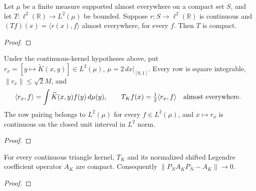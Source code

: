 \begin{supporting}
\begin{theorem}
\label{thm:continuous-l2-rows-compact}
\leanok
Let $\mu$ be a finite measure supported almost everywhere on a compact set $S$,
and let $T:\ell^2(\mathbb R)\to L^2(\mu)$ be bounded. Suppose
$r:S\to\ell^2(\mathbb R)$ is continuous and
$(Tf)(x)=\langle r(x),f\rangle$ almost everywhere, for every $f$.
Then $T$ is compact.
\end{theorem}
\begin{proof}
\leanok
\end{proof}

\begin{theorem}
\label{thm:volterra-l2-rows}
\leanok
Under the continuous-kernel hypotheses above, put
$r_x=[y\mapsto\widetilde K(x,y)]\in L^2(\mu)$, $\mu=2\,dx|_{[0,1]}$.
Every row is square integrable, $\|r_x\|\le\sqrt2 M$, and
\[
 \langle r_x,f\rangle=\int\widetilde K(x,y)f(y)\,d\mu(y),\qquad
 T_Kf(x)=\tfrac12\langle r_x,f\rangle\quad\hbox{almost everywhere}.
\]
The row pairing belongs to $L^2(\mu)$ for every $f\in L^2(\mu)$, and
$x\mapsto r_x$ is continuous on the closed unit interval in $L^2$ norm.
\end{theorem}
\begin{proof}
\leanok
\end{proof}
\end{supporting}


\begin{theorem}
\label{thm:volterra-compact-sections}
\leanok
For every continuous triangle kernel, $T_K$ and its normalized shifted Legendre
coefficient operator $A_K$ are compact. Consequently
$\|P_NA_KP_N-A_K\|\to0$.
\end{theorem}
\begin{proof}
\leanok
\end{proof}


